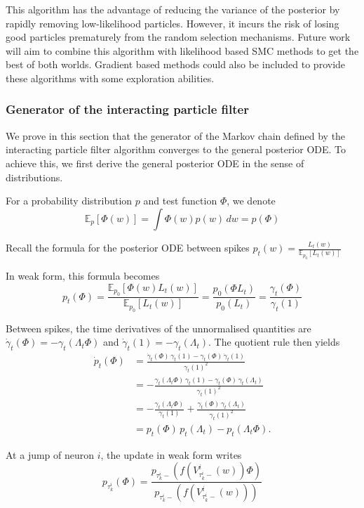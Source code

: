 \documentclass[11pt,a4paper]{article}
\theoremstyle{definition}
\begin{document}
This algorithm has the advantage of reducing the variance of the posterior by rapidly removing low-likelihood particles. However, it incurs the risk of losing good particles prematurely from the random selection mechanisms. Future work will aim to combine this algorithm with likelihood based SMC methods to get the best of both worlds. Gradient based methods could also be included to provide these algorithms with some exploration abilities.

\subsubsection{Generator of the interacting particle filter}
We prove in this section that the generator of the Markov chain defined by the interacting particle filter algorithm converges to the general posterior ODE. To achieve this, we first derive the general posterior ODE in the sense of distributions.

For a probability distribution $p$ and test function $\Phi$, we denote
$$
\mathbb{E}_p[\Phi(w)] = \int \Phi(w) p(w)\, dw = p(\Phi)
$$

Recall the formula for the posterior ODE between spikes
$
p_t (w) = \frac{L_t (w)}{\mathbb{E}_{p_0}[L_t(w)]}
$

In weak form, this formula becomes
$$
p_t (\Phi) = \frac{\mathbb{E}_{p_0}[\Phi(w) L_t (w)]}{\mathbb{E}_{p_0}[L_t(w)]} = \frac{p_0(\Phi L_t)}{p_0(L_t)} = \frac{\gamma_t(\Phi)}{\gamma_t(1)}
$$

Between spikes, the time derivatives of the unnormalised quantities are $\dot\gamma_t(\Phi) = -\gamma_t(\Lambda_t \Phi)$ and $\dot\gamma_t(1) = -\gamma_t(\Lambda_t)$. The quotient rule then yields
\begin{align*}
    \dot{p}_t(\Phi) &= \frac{\dot{\gamma}_t (\Phi)\, \gamma_t(1) - \gamma_t (\Phi)\, \dot{\gamma}_t (1)}{\gamma_t(1)^2} \\
    &= -\frac{\gamma_t(\Lambda_t \Phi)\, \gamma_t(1) - \gamma_t (\Phi)\, \gamma_t(\Lambda_t)}{\gamma_t(1)^2} \\
    &= -\frac{\gamma_t(\Lambda_t \Phi)}{\gamma_t(1)} + \frac{\gamma_t (\Phi)\, \gamma_t(\Lambda_t)}{\gamma_t(1)^2} \\
    &= p_t(\Phi)\, p_t(\Lambda_t) - p_t(\Lambda_t \Phi).
\end{align*}

At a jump of neuron $i$, the update in weak form writes
$$
p_{\tau_k^i}(\Phi) = \frac{p_{\tau_k^i-}(f(V_{\tau_k^i-}^i(w)) \Phi)}{p_{\tau_k^i-}(f(V_{\tau_k^i-}^i(w)))}
$$
\end{document}
